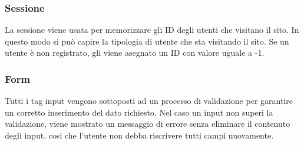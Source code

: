 \subsubsection{Sessione}
La sessione viene usata per memorizzare gli ID degli utenti che visitano il sito. In questo modo si può capire la tipologia di utente che sta visitando il sito. Se un utente è non registrato, gli viene asegnato un ID con valore uguale a -1.

\subsubsection{Form} Tutti i tag input vengono sottoposti ad un processo di validazione per garantire un corretto inserimento del dato richiesto. Nel caso un input non superi la validazione, viene mostrato un messaggio di errore senza eliminare il contenuto degli input, cosi che l'utente non debba riscrivere tutti campi nuovamente.
